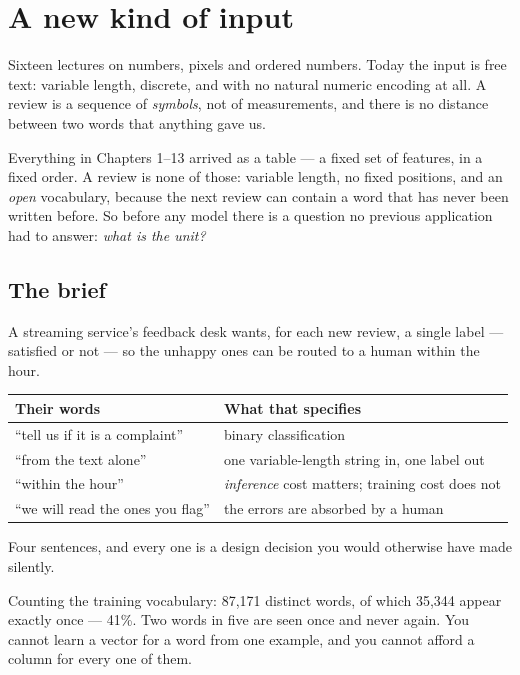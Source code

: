 \documentclass[11pt,a4paper]{article}
\begin{document}

\section{A new kind of input}

Sixteen lectures on numbers, pixels and ordered numbers. Today the input is
free text: variable length, discrete, and with no natural numeric encoding at
all. A review is a sequence of \emph{symbols}, not of measurements, and there is
no distance between two words that anything gave us.

Everything in Chapters 1--13 arrived as a table --- a fixed set of features, in
a fixed order. A review is none of those: variable length, no fixed positions,
and an \emph{open} vocabulary, because the next review can contain a word that
has never been written before. So before any model there is a question no
previous application had to answer: \emph{what is the unit?}

\subsection{The brief}

A streaming service's feedback desk wants, for each new review, a single label
--- satisfied or not --- so the unhappy ones can be routed to a human within the
hour.

\begin{center}
\small
\begin{tabular}{ll}
\toprule
\textbf{Their words} & \textbf{What that specifies} \\
\midrule
``tell us if it is a complaint'' & binary classification \\
``from the text alone'' & one variable-length string in, one label out \\
``within the hour'' & \emph{inference} cost matters; training cost does not \\
``we will read the ones you flag'' & the errors are absorbed by a human \\
\bottomrule
\end{tabular}
\end{center}

Four sentences, and every one is a design decision you would otherwise have
made silently.

Counting the training vocabulary: 87{,}171 distinct words, of which 35{,}344
appear exactly once --- 41\%. Two words in five are seen once and never again.
You cannot learn a vector for a word from one example, and you cannot afford a
column for every one of them.
\end{document}
